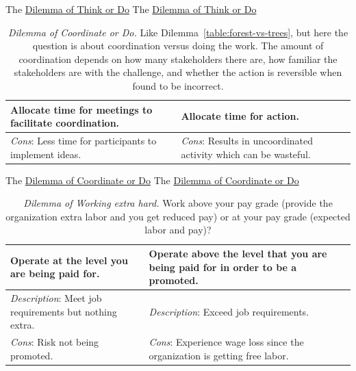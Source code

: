 The \href{table:forest-vs-trees}{Dilemma of Think or Do}
The \href{table:forest-vs-trees}{Dilemma of Think or Do}
  

\begin{center}
\begin{table}[H] %
\begin{tabular}{ | m{\dilemmatablewidth}| m{\dilemmatablewidth} | } 
  \hline
  \textbf{Allocate time for meetings to facilitate coordination.} &
  \textbf{Allocate time for action.} \\
  \hline
  \textit{Cons}: Less time for participants to implement ideas. & 
  \textit{Cons}: Results in uncoordinated activity which can be wasteful. \\
  \hline
\end{tabular}
\caption{\textit{Dilemma of Coordinate or Do.}
Like Dilemma~\ref{table:forest-vs-trees}, but here the question is about coordination versus doing the work. The amount of coordination depends on how many stakeholders there are, how familiar the stakeholders are with the challenge, and whether the action is reversible when found to be incorrect.
}
\label{table:meetings-versus-work}
\end{table}
\end{center}


The \href{table:meetings-versus-work}{Dilemma of Coordinate or Do}
The \href{table:meetings-versus-work}{Dilemma of Coordinate or Do}


\begin{center}
\begin{table}[H] %
\begin{tabular}{ | m{\dilemmatablewidth}| m{\dilemmatablewidth} | } 
  \hline
  \textbf{Operate at the level you are being paid for.} &
  \textbf{Operate above the level that you are being paid for in order to be a promoted.} \\
  \hline
  \textit{Description}: Meet job requirements but nothing extra. &
  \textit{Description}: Exceed job requirements. \\
  \hline
  \textit{Cons}: Risk not being promoted. & 
  \textit{Cons}: Experience wage loss since the organization is getting free labor. \\
  \hline
\end{tabular}
\caption{\textit{Dilemma of Working extra hard.}
Work above your pay grade (provide the organization extra labor and you get reduced pay) or at your pay grade (expected labor and pay)?
}
\label{table:work_extra_or_work_as_expected}
\end{table}
\end{center}

